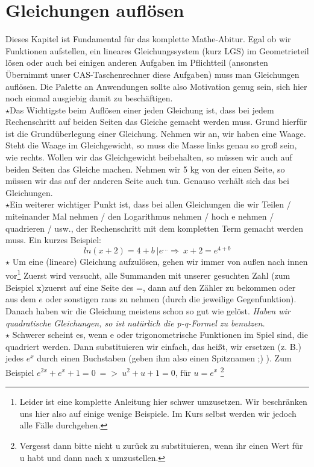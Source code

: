 \section{Gleichungen auflösen}
Dieses Kapitel ist Fundamental für das komplette Mathe-Abitur. Egal ob wir Funktionen aufstellen, ein lineares Gleichungssystem (kurz LGS) im Geometrieteil lösen oder auch bei einigen anderen Aufgaben im Pflichtteil (ansonsten Übernimmt unser CAS-Taschenrechner diese Aufgaben) muss man Gleichungen auflösen. Die Palette an Anwendungen sollte also Motivation genug sein, sich hier noch einmal ausgiebig damit zu beschäftigen.\\
\(\star\)Das Wichtigste beim Auflösen einer jeden Gleichung ist, dass bei jedem Rechenschritt auf beiden Seiten das Gleiche gemacht werden muss. Grund hierfür ist die Grundüberlegung einer Gleichung. Nehmen wir an, wir haben eine Waage. Steht die Waage im Gleichgewicht, so muss die Masse links genau so groß sein, wie rechts. Wollen wir das Gleichgewicht beibehalten, so müssen wir auch auf beiden Seiten das Gleiche machen. Nehmen wir 5 kg von der einen Seite, so müssen wir das auf der anderen Seite auch tun. Genauso verhält sich das bei Gleichungen. \\
\(\star\)Ein weiterer wichtiger Punkt ist, dass bei allen Gleichungen die wir Teilen / miteinander Mal nehmen / den Logarithmus nehmen / hoch e nehmen / quadrieren / usw., der Rechenschritt mit dem kompletten Term gemacht werden muss. Ein kurzes Beispiel:
\[ln(x+2)=4+b\ |e^{...}\Rightarrow\ x+2=e^{4+b}\]
\(\star\) Um eine (lineare) Gleichung aufzulösen, gehen wir immer von außen nach innen vor\footnote{Leider ist eine komplette Anleitung hier schwer umzusetzen. Wir beschränken uns hier also auf einige wenige Beispiele. Im Kurs selbst werden wir jedoch alle Fälle durchgehen.} Zuerst wird versucht, alle Summanden mit unserer gesuchten Zahl (zum Beispiel x)zuerst auf eine Seite des =, dann auf den Zähler zu bekommen oder aus dem \(e\) oder sonstigen raus zu nehmen (durch die jeweilige Gegenfunktion). Danach haben wir die Gleichung meistens schon so gut wie gelöst. \emph{Haben wir quadratische Gleichungen, so ist natürlich die p-q-Formel zu benutzen.}\\
\(\star\) Schwerer scheint es, wenn e oder trigonometrische Funktionen im Spiel sind, die quadriert werden. Dann substituieren wir einfach, das heißt, wir ersetzen (z. B.) jedes \(e^x\) durch einen Buchstaben (geben ihm also einen Spitznamen ;) ). Zum Beispiel \(e^{2x}+e^x+1=0\ =>\ u^2+u+1=0\text{, für }u=e^x\) \footnote{Vergesst dann bitte nicht u zurück zu substituieren, wenn ihr einen Wert für u habt und dann nach x umzustellen.}
